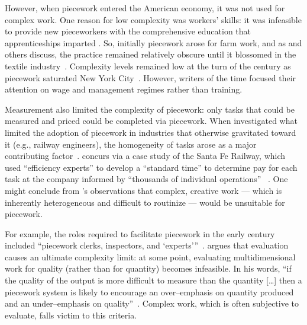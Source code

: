 \documentclass[trackingWork]{subfiles}
\begin{document}
However, when piecework entered the American economy,
it was not used for complex work.
One reason for low complexity was workers' skills: it was infeasible to provide new pieceworkers with the comprehensive education
that apprenticeships imparted \cite{hart2013rise}.
So, initially piecework arose for farm work, and as
\citeauthor{hughRaynbirdTaskWork} and others discuss,
the practice remained relatively obscure until
it blossomed in the textile industry~\cite{hughRaynbirdTaskWork}.
Complexity levels remained low at the turn of
the  century as piecework saturated New York City~\cite{riisOtherSideLives}.
However, writers of the time focused their attention on
wage \cite{burton1899commercial} and
management regimes \cite{norton1900textile}
rather than training.


Measurement also limited the complexity of piecework:
only tasks that could be measured and priced could be completed via piecework. 
When \citeauthor{Brown01041990} investigated
what limited the adoption of piecework in industries that otherwise gravitated toward it
(e.g., railway engineers),
the homogeneity of tasks arose as a major contributing factor~\cite{Brown01041990}.
\citeauthor{10.2307/23702539} concurs via a case study of the Santa Fe Railway,
which used ``efficiency experts'' to develop a ``standard time''
to determine pay for each task at the company informed by
``thousands of individual operations''%
~\cite{10.2307/23702539}.
One might conclude from \citeauthor{10.2307/23702539}'s observations that
complex, creative work
--- which is inherently heterogeneous and difficult to routinize ---
would be unsuitable for piecework.

For example, the roles required to facilitate piecework in the early  century included ``piecework clerks, inspectors, and `experts'''~\cite{10.2307/23702539}.
\citeauthor{hart2016rise} argues that evaluation causes an ultimate complexity limit:
at some point, evaluating multidimensional work for quality
(rather than for quantity) becomes infeasible.
In his words,
``if the quality of the output is more difficult to measure than the quantity [\ldots]
then a piecework system is likely to encourage
an over--emphasis on quantity produced and an under--emphasis on quality''~\cite{hart2016rise}.
Complex work, which is often subjective to evaluate, falls victim to this criteria.
\end{document}
